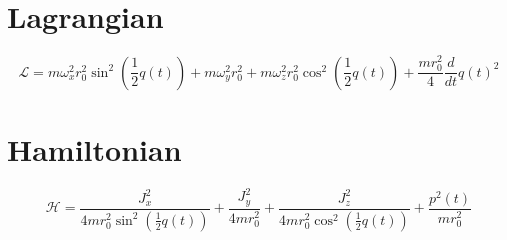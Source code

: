 \documentclass{article}%
\begin{document}
%
\normalsize%
\section*{Lagrangian}%
\begin{dmath}%
\mathcal{L} = m \omega_{x}^{2} r_{0}^{2} \sin^{2}{\left (\frac{1}{2} q{\left (t \right )} \right )} + m \omega_{y}^{2} r_{0}^{2} + m \omega_{z}^{2} r_{0}^{2} \cos^{2}{\left (\frac{1}{2} q{\left (t \right )} \right )} + \frac{m r_{0}^{2}}{4} \frac{d}{d t} q{\left (t \right )}^{2}%
\end{dmath}

%
\section*{Hamiltonian}%
\begin{dmath}%
\mathcal{H} = \frac{J_{x}^{2}}{4 m r_{0}^{2} \sin^{2}{\left (\frac{1}{2} q{\left (t \right )} \right )}} + \frac{J_{y}^{2}}{4 m r_{0}^{2}} + \frac{J_{z}^{2}}{4 m r_{0}^{2} \cos^{2}{\left (\frac{1}{2} q{\left (t \right )} \right )}} + \frac{p^{2}{\left (t \right )}}{m r_{0}^{2}}%
\end{dmath}

%
\end{document}
